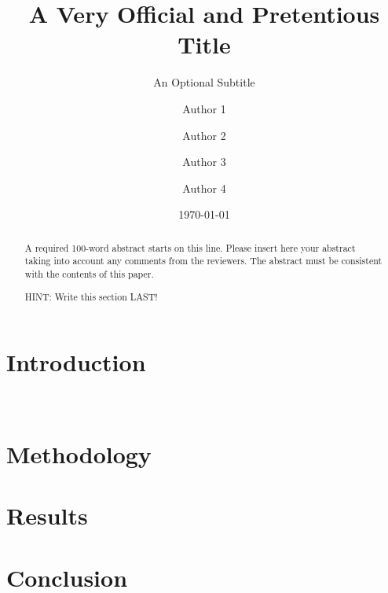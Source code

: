 \documentclass{short_report}
\title{A Very Official and Pretentious Title}
\subtitle{An Optional Subtitle}
\author[1]{Author 1}
\author{Author 2}
\author{Author 3}
\author[1,*]{Author 4}
\affil[1]{Univeresity of New Mexico, Albuquerque, NM 87131}
\affil[*]{Primary Author}
\date{\today}
\begin{document}
    \ReportHeading

    \begin{abstract}
        A required 100-word abstract starts on this line.
        Please insert here your abstract taking into account any comments from the reviewers.
        The abstract must be consistent with the contents of this paper.

        HINT: Write this section LAST!
    \end{abstract}


    \section{Introduction}
    ~\cite{EXAMPLE}


    \section{Methodology}


    \section{Results}


    \section{Conclusion}
    

    
    
\end{document}
